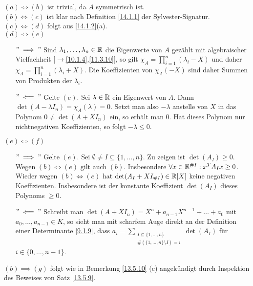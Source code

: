\documentclass[../../main.tex]{subfiles}
\begin{document}
\begin{cproof}
\underline{$(a)\Longleftrightarrow(b)$} ist trivial, da $A$ symmetrisch ist.\\

\noindent\underline{$(b)\Longleftrightarrow(c)$} ist klar nach Definition \ref{14.1.1} der Sylvester-Signatur.\\
	
\noindent\underline{$(c)\Longleftrightarrow(d)$} folgt aus \ref{14.1.2}(a).\\

\noindent\underline{$(d)\Longleftrightarrow(e)$}
\begin{itemize}
\item[$"\implies"$] Sind $\lambda_1,\ldots ,\lambda_n\in \mathbb R$ die Eigenwerte von $A$ gezählt mit algebraischer Vielfachheit [$\to$\ref{10.1.4},\ref{11.3.10}], so gilt $\chi_A=\prod_{i=1}^n (\lambda_i-X)$ und daher $\chi_A=\prod_{i=1}^n (\lambda_i+X)$. Die Koeffizienten von $\chi_A(-X)$ sind daher Summen von Produkten der $\lambda_i$.
\item[$"\impliedby"$] Gelte $(e)$. Sei $\lambda\in \mathbb R$ ein Eigenwert von $A$. Dann $\det(A-\lambda I_n)=\chi_A(\lambda)=0$. Setzt man also $-\lambda$ anstelle von $X$ in das Polynom $0\neq \det(A+XI_n)$ ein, so erhält man 0. Hat dieses Polynom nur nichtnegativen Koeffizienten, so folgt $-\lambda\le 0$.
\end{itemize}

\noindent\underline{$(e)\Longleftrightarrow(f)$}\begin{itemize}
\item[$"\implies"$] Gelte $(e)$. Sei $\emptyset\neq I\subseteq\{1,\ldots ,n\}$. Zu zeigen ist $\det(A_I)\ge 0$. Wegen $(b)\Longleftrightarrow (e)$ gilt auch $(b)$. Insbesondere $\forall x\in \mathbb R^{\# I}: x^TA_Ix\ge 0$. Wieder wegen $(b)\Longleftrightarrow (e)$ hat $\det(A_I+XI_{\# I})\in \mathbb R[X]$ keine negativen Koeffizienten. Insbesondere ist der konstante Koeffizient $\det (A_I)$ dieses Polynoms $\ge 0$.
\item[$"\impliedby"$] Schreibt man $\det(A+XI_n)=X^n+a_{n-1}X^{n-1}+\ldots +a_0$ mit $a_0,\ldots ,a_{n-1}\in K$, so sieht man mit scharfem Auge direkt an der Definition einer Determinante \ref{9.1.9}, dass $a_i=\sum_{\substack{I\subseteq \{1,\ldots ,n\}\\\#(\{1,\ldots ,n\}\setminus I)=i}} \det(A_I)$ für $i\in\{0,\ldots ,n-1\}$.
\end{itemize}

\noindent\underline{$(b)\implies (g)$} folgt wie in Bemerkung \ref{13.5.10} (c) angekündigt durch Inspektion des Beweises von Satz \ref{13.5.9}.


\end{cproof}
\end{document}
